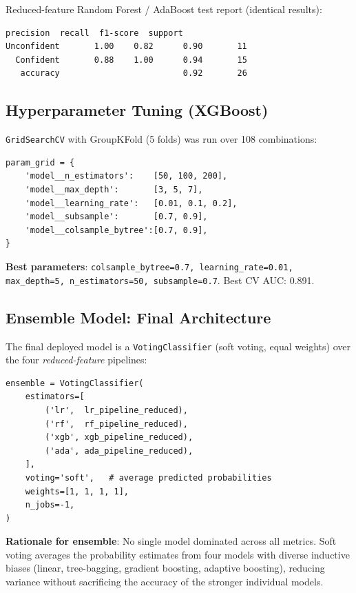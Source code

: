 \documentclass[12pt,a4paper]{article}
\begin{document}
Reduced-feature Random Forest / AdaBoost test report (identical results):
\begin{lstlisting}[numbers=none]
              precision  recall  f1-score  support
Unconfident       1.00    0.82      0.90       11
  Confident       0.88    1.00      0.94       15
   accuracy                         0.92       26
\end{lstlisting}

\subsection{Hyperparameter Tuning (XGBoost)}

\texttt{GridSearchCV} with GroupKFold (5 folds) was run over 108 combinations:

\begin{lstlisting}[style=python, numbers=none]
param_grid = {
    'model__n_estimators':    [50, 100, 200],
    'model__max_depth':       [3, 5, 7],
    'model__learning_rate':   [0.01, 0.1, 0.2],
    'model__subsample':       [0.7, 0.9],
    'model__colsample_bytree':[0.7, 0.9],
}
\end{lstlisting}

\textbf{Best parameters}: \texttt{colsample\_bytree=0.7, learning\_rate=0.01, max\_depth=5, n\_estimators=50, subsample=0.7}. Best CV AUC: 0.891.

\subsection{Ensemble Model: Final Architecture}

The final deployed model is a \texttt{VotingClassifier} (soft voting, equal weights) over the four \textit{reduced-feature} pipelines:

\begin{lstlisting}[style=python, numbers=none]
ensemble = VotingClassifier(
    estimators=[
        ('lr',  lr_pipeline_reduced),
        ('rf',  rf_pipeline_reduced),
        ('xgb', xgb_pipeline_reduced),
        ('ada', ada_pipeline_reduced),
    ],
    voting='soft',   # average predicted probabilities
    weights=[1, 1, 1, 1],
    n_jobs=-1,
)
\end{lstlisting}

\textbf{Rationale for ensemble}: No single model dominated across all metrics. Soft voting averages the probability estimates from four models with diverse inductive biases (linear, tree-bagging, gradient boosting, adaptive boosting), reducing variance without sacrificing the accuracy of the stronger individual models.
\end{document}
